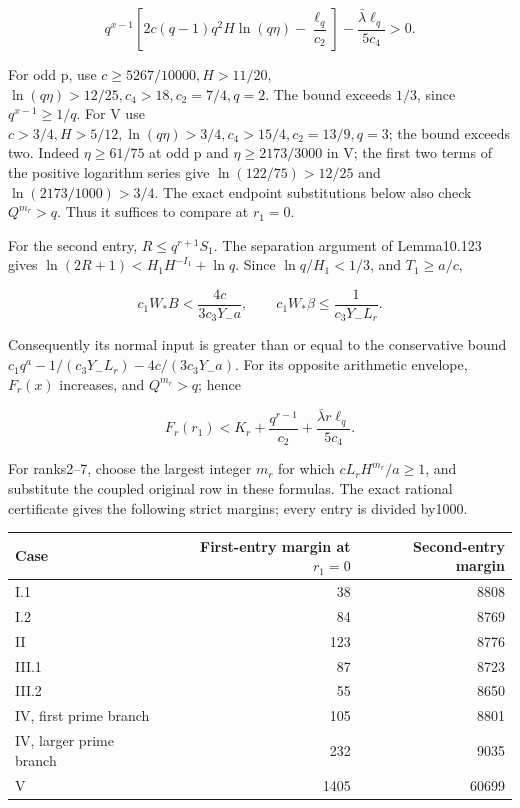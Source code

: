 \documentclass[
  11pt,
  a4paper,
]{article}
\newcounter{none} %
\begin{document}
\[
q^{x-1}\left[2c(q-1)q^2H\ln(q\eta)-\frac{\ell_q}{c_2}\right]
-\frac{\bar\lambda\ell_q}{5c_4}>0.
\tag{10.426}
\]

For odd p, use \(c\ge5267/10000,H>11/20\),
\(\ln(q\eta)>12/25,c_4>18,c_2=7/4,q=2\). The bound exceeds \(1/3\),
since \(q^{x-1}\ge1/q\). For V use
\(c>3/4,H>5/12,\ln(q\eta)>3/4,c_4>15/4,c_2=13/9,q=3\); the bound exceeds
two. Indeed \(\eta\ge61/75\) at odd p and \(\eta\ge2173/3000\) in V; the
first two terms of the positive logarithm series give
\(\ln(122/75)>12/25\) and \(\ln(2173/1000)>3/4\). The exact endpoint
substitutions below also check \(Q^{m_r}>q\). Thus it suffices to
compare at \(r_1=0\).

For the second entry, \(R\le q^{r+1}S_1\). The separation argument of
Lemma10.123 gives \(\ln(2R+1)<H_1H^{-I_1}+\ln q\). Since
\(\ln q/H_1<1/3\), and \(T_1\ge a/c\),

\[
c_1W_*B<\frac{4c}{3c_3Y_-a},\qquad
c_1W_*\beta\le\frac1{c_3Y_-L_r}.
\tag{10.427}
\]

Consequently its normal input is greater than or equal to the
conservative bound \(c_1q^a-1/(c_3Y_-L_r)-4c/(3c_3Y_-a)\). For its
opposite arithmetic envelope, \(F_r(x)\) increases, and \(Q^{m_r}>q\);
hence

\[
F_r(r_1)<K_r+\frac{q^{r-1}}{c_2}
                  +\frac{\bar\lambda r\ell_q}{5c_4}.
\tag{10.428}
\]

For ranks2--7, choose the largest integer \(m_r\) for which
\(cL_rH^{m_r}/a\ge1\), and substitute the coupled original row in these
formulas. The exact rational certificate gives the following strict
margins; every entry is divided by1000.

{\def\LTcaptype{none} %
\begin{longtable}[]{@{}lrr@{}}
\toprule\noalign{}
Case & First-entry margin at \(r_1=0\) & Second-entry margin \\
\midrule\noalign{}
\endhead
\bottomrule\noalign{}
\endlastfoot
I.1 & 38 & 8808 \\
I.2 & 84 & 8769 \\
II & 123 & 8776 \\
III.1 & 87 & 8723 \\
III.2 & 55 & 8650 \\
IV, first prime branch & 105 & 8801 \\
IV, larger prime branch & 232 & 9035 \\
V & 1405 & 60699 \\
\end{longtable}
}
\end{document}
